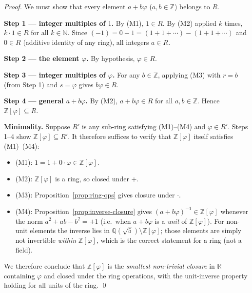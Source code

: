 \begin{proof}
  We must show that every element $a + b\varphi$ ($a, b \in \mathbb{Z}$)
  belongs to $R$.

  \medskip
  \noindent\textbf{Step 1 — integer multiples of $1$.}
  By (M1), $1 \in R$.  By (M2) applied $k$ times, $k\cdot 1 \in R$ for
  all $k \in \mathbb{N}$.  Since $(-1) = 0 - 1 = (1+1+\cdots) - (1+1+\cdots)$
  and $0 \in R$ (additive identity of any ring), all integers $a \in R$.

  \medskip
  \noindent\textbf{Step 2 — the element $\varphi$.}
  By hypothesis, $\varphi \in R$.

  \medskip
  \noindent\textbf{Step 3 — integer multiples of $\varphi$.}
  For any $b \in \mathbb{Z}$, applying (M3) with $r = b$ (from Step 1)
  and $s = \varphi$ gives $b\varphi \in R$.

  \medskip
  \noindent\textbf{Step 4 — general $a + b\varphi$.}
  By (M2), $a + b\varphi \in R$ for all $a, b \in \mathbb{Z}$.
  Hence $\mathbb{Z}[\varphi] \subseteq R$.

  \medskip
  \noindent\textbf{Minimality.}
  Suppose $R'$ is any sub-ring satisfying (M1)--(M4) and $\varphi \in R'$.
  Steps 1--4 show $\mathbb{Z}[\varphi] \subseteq R'$.  It therefore
  suffices to verify that $\mathbb{Z}[\varphi]$ itself satisfies
  (M1)--(M4):
  \begin{itemize}
    \item (M1): $1 = 1 + 0\cdot\varphi \in \mathbb{Z}[\varphi]$.
    \item (M2): $\mathbb{Z}[\varphi]$ is a ring, so closed under $+$.
    \item (M3): Proposition~\ref{prop:ring-ops} gives closure under $\cdot$.
    \item (M4): Proposition~\ref{prop:inverse-closure} gives
      $(a+b\varphi)^{-1} \in \mathbb{Z}[\varphi]$ whenever the norm
      $a^2+ab-b^2 = \pm 1$ (i.e.\ when $a+b\varphi$ is a \emph{unit}
      of $\mathbb{Z}[\varphi]$).  For non-unit elements the inverse lies
      in $\mathbb{Q}(\sqrt{5}) \setminus \mathbb{Z}[\varphi]$; those
      elements are simply not invertible \emph{within}
      $\mathbb{Z}[\varphi]$, which is the correct statement for a ring
      (not a field).
  \end{itemize}
  We therefore conclude that $\mathbb{Z}[\varphi]$ is the
  \emph{smallest non-trivial closure} in $\mathbb{R}$ containing $\varphi$
  and closed under the ring operations, with the unit-inverse property
  holding for all units of the ring.  \qed
\end{proof}

